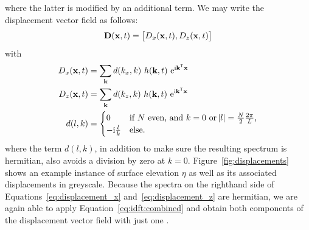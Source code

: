 where the latter is modified by an additional term. We may write the displacement vector field as follows:
\begin{equation}
 \mathbf{D}(\mathbf{x},t) = \left[D_x(\mathbf{x},t), D_z(\mathbf{x},t)\right]
\end{equation}
with
\begin{align}
\label{eq:displacement_x} D_x(\mathbf{x},t) &= \sum_{\mathbf{k}}d(k_x, 
k)~h(\mathbf{k},t)~\mathrm{e}^{\mathrm{i}\mathbf{k}^{\mathsf{T}}\mathbf{x}} \\
\label{eq:displacement_z} D_z(\mathbf{x},t) &= \sum_{\mathbf{k}}d(k_z, 
k)~h(\mathbf{k},t)~\mathrm{e}^{\mathrm{i}\mathbf{k}^{\mathsf{T}}\mathbf{x}} \\
 d(l, k) &= \begin{cases}
             0 &\text{if $N$ even, and $k = 0$ or $\abs{l} = 
\frac{N}{2}\frac{2\pi}{L}$,} \\
             -\mathrm{i}\frac{l}{k} &\text{else.}
            \end{cases}
\end{align}
where the term $d(l, k)$, in addition to make sure the resulting spectrum is 
hermitian, also avoids a division by zero at $k = 0$. 
Figure~\ref{fig:displacements} shows an example instance of surface elevation 
$\eta$ as well as its associated displacements in greyscale.
Because the spectra on the righthand side of Equations~\ref{eq:displacement_x} 
and~\ref{eq:displacement_z} are hermitian, we are again able to apply 
Equation~\ref{eq:idft:combined} and obtain both components of the displacement 
vector field with just one \InvFourierTransform.


